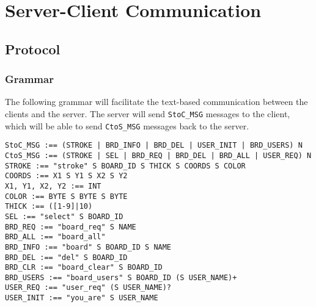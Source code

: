 \section{Server-Client Communication}

\subsection{Protocol}

\subsubsection{Grammar}
The following grammar will facilitate the text-based communication between the clients and the server. The server will send \texttt{StoC\_MSG} messages to the client, which will be able to send \texttt{CtoS\_MSG} messages back to the server.

\vspace{5mm}

\setlength{\parindent}{0in}

\texttt{StoC\_MSG :== (STROKE | BRD\_INFO | BRD\_DEL | USER\_INIT | BRD\_USERS) N}\\

\texttt{CtoS\_MSG :== (STROKE | SEL | BRD\_REQ | BRD\_DEL | BRD\_ALL | USER\_REQ) N}\\


\texttt{STROKE :== "stroke" S BOARD\_ID S THICK S COORDS S COLOR}\\
\texttt{COORDS :== X1 S Y1 S X2 S Y2}\\
\texttt{X1, Y1, X2, Y2 :== INT}\\
\texttt{COLOR :== BYTE S BYTE S BYTE}\\
\texttt{THICK :== ([1-9]|10)}\\ %

\texttt{SEL :== "select" S BOARD\_ID}\\

\texttt{BRD\_REQ :== "board\_req" S NAME}\\
\texttt{BRD\_ALL :== "board\_all"}\\
\texttt{BRD\_INFO :== "board" S BOARD\_ID S NAME}\\
\texttt{BRD\_DEL :== "del" S BOARD\_ID}\\
\texttt{BRD\_CLR :== "board\_clear" S BOARD\_ID}\\
\texttt{BRD\_USERS :== "board\_users" S BOARD\_ID (S USER\_NAME)+}\\

\texttt{USER\_REQ :== "user\_req" (S USER\_NAME)?}\\
\texttt{USER\_INIT :== "you\_are" S USER\_NAME}\\

